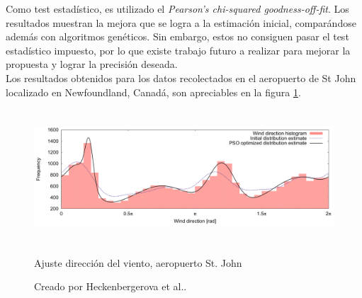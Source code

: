 Como test estadístico, es utilizado el \emph{Pearson's chi-squared goodness-off-fit}. Los resultados muestran la mejora que se logra a la estimación inicial, comparándose además con algoritmos genéticos. Sin embargo, estos no consiguen pasar el test estadístico impuesto, por lo que existe trabajo futuro  a realizar para mejorar la propuesta y lograr la precisión deseada.\\
Los resultados obtenidos para los datos recolectados en el aeropuerto de St John localizado en Newfoundland, Canadá, son apreciables en la figura \ref{fig:dir_pso}.
\begin{figure}[h!]
    \centering    
    \includegraphics[height=50mm]{figures/dir_pso.png} 
    \caption{Ajuste dirección del viento, aeropuerto St. John}
    \vspace{-.25cm} 
    \caption*{Creado por Heckenbergerova et al.\cite{Heckenbergerova15}.}
    \label{fig:dir_pso}
\end{figure}

